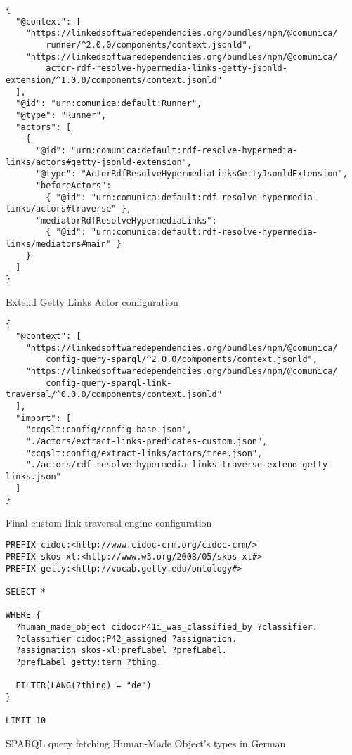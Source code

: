 \begin{listing}[htbp]
    \begin{verbatim}
{
  "@context": [
    "https://linkedsoftwaredependencies.org/bundles/npm/@comunica/
        runner/^2.0.0/components/context.jsonld",
    "https://linkedsoftwaredependencies.org/bundles/npm/@comunica/
        actor-rdf-resolve-hypermedia-links-getty-jsonld-extension/^1.0.0/components/context.jsonld"
  ],
  "@id": "urn:comunica:default:Runner",
  "@type": "Runner",
  "actors": [
    {
      "@id": "urn:comunica:default:rdf-resolve-hypermedia-links/actors#getty-jsonld-extension",
      "@type": "ActorRdfResolveHypermediaLinksGettyJsonldExtension",
      "beforeActors":
        { "@id": "urn:comunica:default:rdf-resolve-hypermedia-links/actors#traverse" },
      "mediatorRdfResolveHypermediaLinks":
        { "@id": "urn:comunica:default:rdf-resolve-hypermedia-links/mediators#main" }
    }
  ]
}
    \end{verbatim}
    \caption{Extend Getty Links Actor configuration}
    \label{lst:actor_config_getty}
\end{listing}

\begin{listing}[htbp]
    \begin{verbatim}
{
  "@context": [
    "https://linkedsoftwaredependencies.org/bundles/npm/@comunica/
        config-query-sparql/^2.0.0/components/context.jsonld",
    "https://linkedsoftwaredependencies.org/bundles/npm/@comunica/
        config-query-sparql-link-traversal/^0.0.0/components/context.jsonld"
  ],
  "import": [
    "ccqslt:config/config-base.json",
    "./actors/extract-links-predicates-custom.json",
    "ccqslt:config/extract-links/actors/tree.json",
    "./actors/rdf-resolve-hypermedia-links-traverse-extend-getty-links.json"
  ]
}
    \end{verbatim}
    \caption{Final custom link traversal engine configuration}
    \label{lst:config_final}
\end{listing}

\begin{listing}[htbp]
    \begin{verbatim}
PREFIX cidoc:<http://www.cidoc-crm.org/cidoc-crm/>
PREFIX skos-xl:<http://www.w3.org/2008/05/skos-xl#>
PREFIX getty:<http://vocab.getty.edu/ontology#>

SELECT *

WHERE {
  ?human_made_object cidoc:P41i_was_classified_by ?classifier.
  ?classifier cidoc:P42_assigned ?assignation.
  ?assignation skos-xl:prefLabel ?prefLabel.
  ?prefLabel getty:term ?thing.
  
  FILTER(LANG(?thing) = "de")
}

LIMIT 10
    \end{verbatim}
    \caption{SPARQL query fetching Human-Made Object's types in German}
    \label{lst:sparql_hmo_types_german}
\end{listing}

